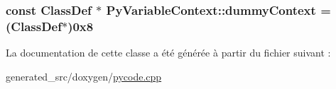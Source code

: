 \subsubsection[{dummy\+Context}]{\setlength{\rightskip}{0pt plus 5cm}const {\bf Class\+Def} $\ast$ Py\+Variable\+Context\+::dummy\+Context = ({\bf Class\+Def}$\ast$)0x8\hspace{0.3cm}{\ttfamily [static]}}\label{class_py_variable_context_abb3568aff90a5041f86f2219974acc97}


La documentation de cette classe a été générée à partir du fichier suivant \+:\begin{DoxyCompactItemize}
\item 
generated\+\_\+src/doxygen/\hyperlink{pycode_8cpp}{pycode.\+cpp}\end{DoxyCompactItemize}

